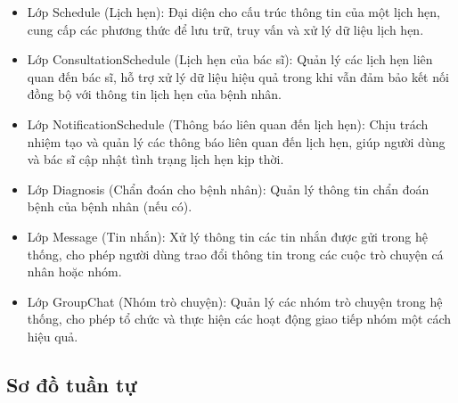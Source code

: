 \begin{itemize}
	\item Lớp Schedule (Lịch hẹn): Đại diện cho cấu trúc thông tin của một lịch hẹn, cung cấp các phương thức để lưu trữ, truy vấn và xử lý dữ liệu lịch hẹn.
	\item Lớp ConsultationSchedule (Lịch hẹn của bác sĩ): Quản lý các lịch hẹn liên quan đến bác sĩ, hỗ trợ xử lý dữ liệu hiệu quả trong khi vẫn đảm bảo kết nối đồng bộ với thông tin lịch hẹn của bệnh nhân.
	\item Lớp NotificationSchedule (Thông báo liên quan đến lịch hẹn): Chịu trách nhiệm tạo và quản lý các thông báo liên quan đến lịch hẹn, giúp người dùng và bác sĩ cập nhật tình trạng lịch hẹn kịp thời.
	\item Lớp Diagnosis (Chẩn đoán cho bệnh nhân): Quản lý thông tin chẩn đoán bệnh của bệnh nhân (nếu có).
	\item Lớp Message (Tin nhắn): Xử lý thông tin các tin nhắn được gửi trong hệ thống, cho phép người dùng trao đổi thông tin trong các cuộc trò chuyện cá nhân hoặc nhóm.
	\item Lớp GroupChat (Nhóm trò chuyện): Quản lý các nhóm trò chuyện trong hệ thống, cho phép tổ chức và thực hiện các hoạt động giao tiếp nhóm một cách hiệu quả.
\end{itemize}
\subsection{Sơ đồ tuần tự}





